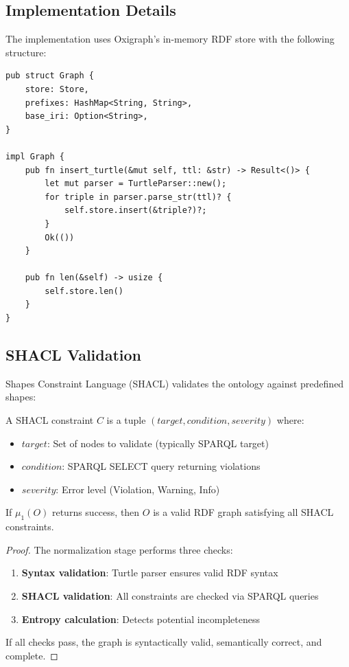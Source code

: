 \subsection{Implementation Details}

The implementation uses Oxigraph's in-memory RDF store with the following structure:

\begin{verbatim}
pub struct Graph {
    store: Store,
    prefixes: HashMap<String, String>,
    base_iri: Option<String>,
}

impl Graph {
    pub fn insert_turtle(&mut self, ttl: &str) -> Result<()> {
        let mut parser = TurtleParser::new();
        for triple in parser.parse_str(ttl)? {
            self.store.insert(&triple?)?;
        }
        Ok(())
    }

    pub fn len(&self) -> usize {
        self.store.len()
    }
}
\end{verbatim}

\subsection{SHACL Validation}

Shapes Constraint Language (SHACL) validates the ontology against predefined shapes:

\begin{definition}
    A SHACL constraint \(C\) is a tuple \((target, condition, severity)\) where:
    \begin{itemize}
        \item \(target\): Set of nodes to validate (typically SPARQL target)
        \item \(condition\): SPARQL SELECT query returning violations
        \item \(severity\): Error level (Violation, Warning, Info)
    \end{itemize}
\end{definition}

\begin{theorem}
    If \(\mu_1(O)\) returns success, then \(O\) is a valid RDF graph satisfying all SHACL constraints.
\end{theorem}

\begin{proof}
    The normalization stage performs three checks:
    \begin{enumerate}
        \item \textbf{Syntax validation}: Turtle parser ensures valid RDF syntax
        \item \textbf{SHACL validation}: All constraints are checked via SPARQL queries
        \item \textbf{Entropy calculation}: Detects potential incompleteness
    \end{enumerate}
    If all checks pass, the graph is syntactically valid, semantically correct, and complete.
\end{proof}

